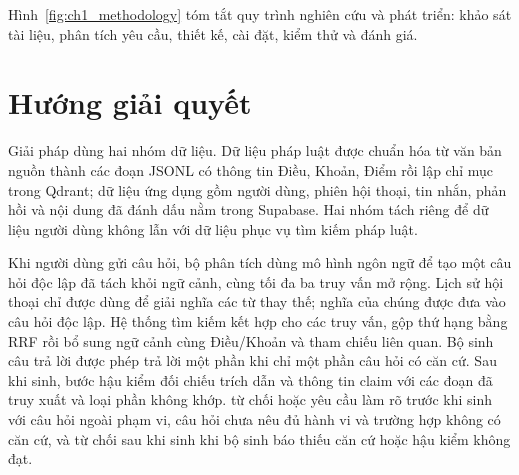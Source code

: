 \documentclass[12pt,a4paper,oneside]{report}
\begin{document}
Hình~\ref{fig:ch1_methodology} tóm tắt quy trình nghiên cứu và phát triển: khảo sát tài liệu, phân tích yêu cầu, thiết kế, cài đặt, kiểm thử và đánh giá.

\section{Hướng giải quyết}
Giải pháp dùng hai nhóm dữ liệu. Dữ liệu pháp luật được chuẩn hóa từ văn bản nguồn thành các đoạn JSONL có thông tin Điều, Khoản, Điểm rồi lập chỉ mục trong Qdrant; dữ liệu ứng dụng gồm người dùng, phiên hội thoại, tin nhắn, phản hồi và nội dung đã đánh dấu nằm trong Supabase. Hai nhóm tách riêng để dữ liệu người dùng không lẫn với dữ liệu phục vụ tìm kiếm pháp luật.

Khi người dùng gửi câu hỏi, bộ phân tích dùng mô hình ngôn ngữ để tạo một câu hỏi độc lập đã tách khỏi ngữ cảnh, cùng tối đa ba truy vấn mở rộng. Lịch sử hội thoại chỉ được dùng để giải nghĩa các từ thay thế; nghĩa của chúng được đưa vào câu hỏi độc lập. Hệ thống tìm kiếm kết hợp cho các truy vấn, gộp thứ hạng bằng RRF rồi bổ sung ngữ cảnh cùng Điều/Khoản và tham chiếu liên quan. Bộ sinh câu trả lời được phép trả lời một phần khi chỉ một phần câu hỏi có căn cứ. Sau khi sinh, bước hậu kiểm đối chiếu trích dẫn và thông tin claim với các đoạn đã truy xuất và loại phần không khớp. từ chối hoặc yêu cầu làm rõ trước khi sinh với câu hỏi ngoài phạm vi, câu hỏi chưa nêu đủ hành vi và trường hợp không có căn cứ, và từ chối sau khi sinh khi bộ sinh báo thiếu căn cứ hoặc hậu kiểm không đạt.
\end{document}
